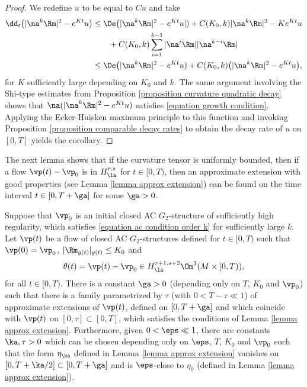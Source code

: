 \documentclass[hidelinks, 12pt, oneside, reqno]{amsart}
\begin{document}
\begin{proof}
    We redefine $u$ to be equal to $Cu$ and take
    \begin{align*}
        \dd_t \big(|\na^k \Rm|^2 - e^{Kt}u\big) &\le \De 
        \big(|\na^k \Rm|^2 - e^{Kt}u|) + C(K_0,k)|\na^k \Rm|^2 - Ke^{Kt}u \\
        &\qquad + C(K_0,k)\sum_{i=1}^{k-1} |\na^i \Rm||\na^{k-i} \Rm|\\
        &\le \De \big(|\na^k \Rm|^2 - e^{Kt}u) + C(K_0,k)\big(|\na^k \Rm|^2 - e^{Kt}u\big),
    \end{align*}
    for $K$ sufficiently large depending on $K_0$ and $k$. The same argument involving the Shi-type estimates from Proposition \ref{proposition curvature quadratic decay} shows that $\na (|\na^k \Rm|^2-e^{Kt}u)$ satisfies \eqref{equation growth condition}.  Applying the Ecker-Huisken maximum principle to this function and invoking Proposition \ref{proposition comparable decay rates} to obtain the decay rate of $u$ on $[0,T]$ yields the corollary.
\end{proof}

The next lemma shows that if the curvature tensor is uniformly bounded, then if a flow $\vp(t) - \vp_0$ is in $H^{r,s}_\la$ for $t \in [0, T)$, then an approximate extension with good properties (see Lemma \ref{lemma approx extension}) can be found on the time interval $t \in [0, T+\ga]$ for some $\ga > 0$.


\begin{lem}\label{lemma approximate solution for AC preservation}
Suppose that $\vp_0$ is an initial closed AC $G_2$-structure of sufficiently high regularity, which satisfies \eqref{equation ac condition order k} for sufficiently large $k$. Let $\vp(t)$ be a flow of closed AC $G_2$-structures defined for $t \in [0, T)$ such that $\vp(0) = \vp_0$, $|\Rm_{g(t)}|_{g(t)} \le K_0$ and 
\[
\theta(t) = \vp(t) - \vp_0 \in H^{r+1, s+2}_{\la} \Om^3(M \times [0,T)),
\]
for all $t \in [0,T)$. There is a constant $\ga >0$ (depending only on $T$, $K_0$ and $\vp_0$) such that there is a family parametrized by $\tau$ (with $0 < T-\tau \ll 1$) of approximate extensions of $\vp(t)$, defined on $[0,T+\ga]$ and which coincide with $\vp(t)$ on $[0,\tau] \subset [0,T]$, which satisfies the conditions of Lemma \ref{lemma approx extension}. Furthermore, given $0 < \eps \ll 1$, there are constants $\ka, \tau >0$ which can be chosen depending only on $\eps$, $T$, $K_0$ and $\vp_0$ such that the form $\eta_\ka$ defined in Lemma \ref{lemma approx extension} vanishes on $[0, T + \ka/2] \subset [0,T+\ga]$ and is $\eps$-close to $\eta_0$ (defined in Lemma \ref{lemma approx extension}). 
\end{lem}
\end{document}
